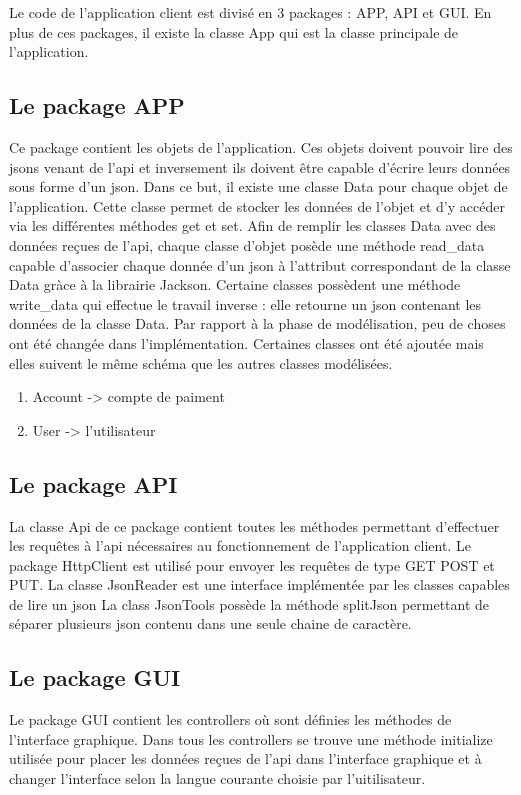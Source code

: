 \documentclass[../rapport.tex]{subfiles}
\begin{document}
Le code de l'application client est divisé en 3 packages : APP, API et GUI.
En plus de ces packages, il existe la classe App qui est la classe principale de l'application. 

\subsection{Le package APP}
Ce package contient les objets de l'application. Ces objets doivent pouvoir lire des jsons venant de l'api et inversement ils doivent être capable
d'écrire leurs données sous forme d'un json. Dans ce but, il existe une classe Data pour chaque objet de l'application. Cette classe permet de stocker 
les données de l'objet et d'y accéder via les différentes méthodes get et set. 
Afin de remplir les classes Data avec des données reçues de l'api, chaque classe d'objet posède une méthode read_data capable d'associer
chaque donnée d'un json à l'attribut correspondant de la classe Data gràce à la librairie Jackson.  
Certaine classes possèdent une méthode write_data qui effectue le travail inverse : elle retourne un json contenant les données de la classe Data.
Par rapport à la phase de modélisation, peu de choses ont été changée dans l'implémentation. Certaines classes ont été ajoutée mais elles suivent le même schéma que 
les autres classes modélisées.

\begin{enumerate}
\item Account -> compte de paiment
\item User -> l'utilisateur
\end{enumerate}

\subsection{Le package API}
La classe Api de ce package contient toutes les méthodes permettant d'effectuer les requêtes à l'api nécessaires au fonctionnement de l'application client.
Le package HttpClient est utilisé pour envoyer les requêtes de type GET POST et PUT.
La classe JsonReader est une interface implémentée par les classes capables de lire un json
La class JsonTools possède la méthode splitJson permettant de séparer plusieurs json contenu dans une seule chaine de caractère.

\subsection{Le package GUI}
Le package GUI contient les controllers où sont définies les méthodes de l'interface graphique. 
Dans tous les controllers se trouve une méthode initialize utilisée pour placer les données reçues de l'api dans l'interface graphique et à changer l'interface
selon la langue courante choisie par l'uitilisateur.
\end{document}
